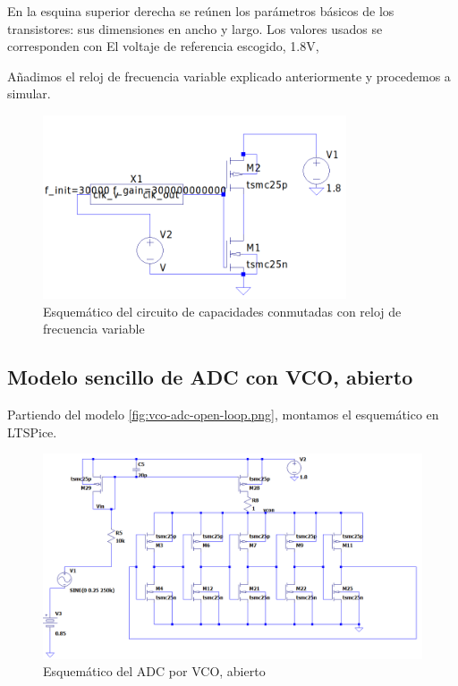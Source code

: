 \documentclass[12pt]{report} %
\begin{document}
	En la esquina superior derecha se reúnen los parámetros básicos de los transistores: sus dimensiones en ancho y largo. Los valores usados se corresponden con %
	El voltaje de referencia escogido, 1.8V, %
	
	Añadimos el reloj de frecuencia variable explicado anteriormente y procedemos a simular.

	\begin{figure}[H]
		\includegraphics[width=0.8\textwidth]{ltspice-sw-with-clk-freq.png}
		\caption[Esquemático del circuito de capacidades conmutadas con reloj de frecuencia variable]{Esquemático del circuito de capacidades conmutadas con reloj de frecuencia variable}
		\label{fig:ltspice-sw-with-clk-freq.png}
	\end{figure}

	

	
	\subsection{Modelo sencillo de ADC con VCO, abierto} %
	
	Partiendo del modelo \ref{fig:vco-adc-open-loop.png}, montamos el esquemático en LTSPice.
	
	\begin{figure}[H]
		\includegraphics[width=\textwidth]{ltspice-vco-open.png}
		\caption[Esquemático del ADC por VCO, abierto]{Esquemático del ADC por VCO, abierto}
		\label{fig:ltspice-vco-open.png}
	\end{figure}
	
\end{document}
